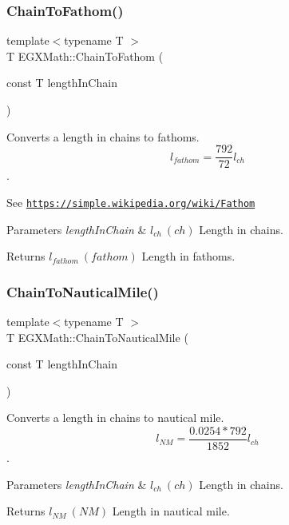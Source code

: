 \subsubsection{\texorpdfstring{Chain\+To\+Fathom()}{ChainToFathom()}}
{\footnotesize\ttfamily template$<$typename T $>$ \\
T E\+G\+X\+Math\+::\+Chain\+To\+Fathom (\begin{DoxyParamCaption}\item[{const T}]{length\+In\+Chain }\end{DoxyParamCaption})}



Converts a length in chains to fathoms. \[ l_{fathom}= \frac{792}{72} l_{ch} \]. 

See \href{https://simple.wikipedia.org/wiki/Fathom}{\tt https\+://simple.\+wikipedia.\+org/wiki/\+Fathom} 
\begin{DoxyParams}{Parameters}
{\em length\+In\+Chain} & $ l_{ch}\ (ch)$ Length in chains. \\
\hline
\end{DoxyParams}
\begin{DoxyReturn}{Returns}
$ l_{fathom}\ (fathom)$ Length in fathoms. 
\end{DoxyReturn}
\mbox{\label{group___e_g_x_math-_conversions-_length_conversions-_imperial-_chain-_nautical_gad4c03e3aae08135e79dd4b6becc65d47}} 
\subsubsection{\texorpdfstring{Chain\+To\+Nautical\+Mile()}{ChainToNauticalMile()}}
{\footnotesize\ttfamily template$<$typename T $>$ \\
T E\+G\+X\+Math\+::\+Chain\+To\+Nautical\+Mile (\begin{DoxyParamCaption}\item[{const T}]{length\+In\+Chain }\end{DoxyParamCaption})}



Converts a length in chains to nautical mile. \[ l_{NM}= \frac{0.0254 * 792}{1852} l_{ch} \]. 


\begin{DoxyParams}{Parameters}
{\em length\+In\+Chain} & $ l_{ch}\ (ch)$ Length in chains. \\
\hline
\end{DoxyParams}
\begin{DoxyReturn}{Returns}
$ l_{NM}\ (NM)$ Length in nautical mile. 
\end{DoxyReturn}
